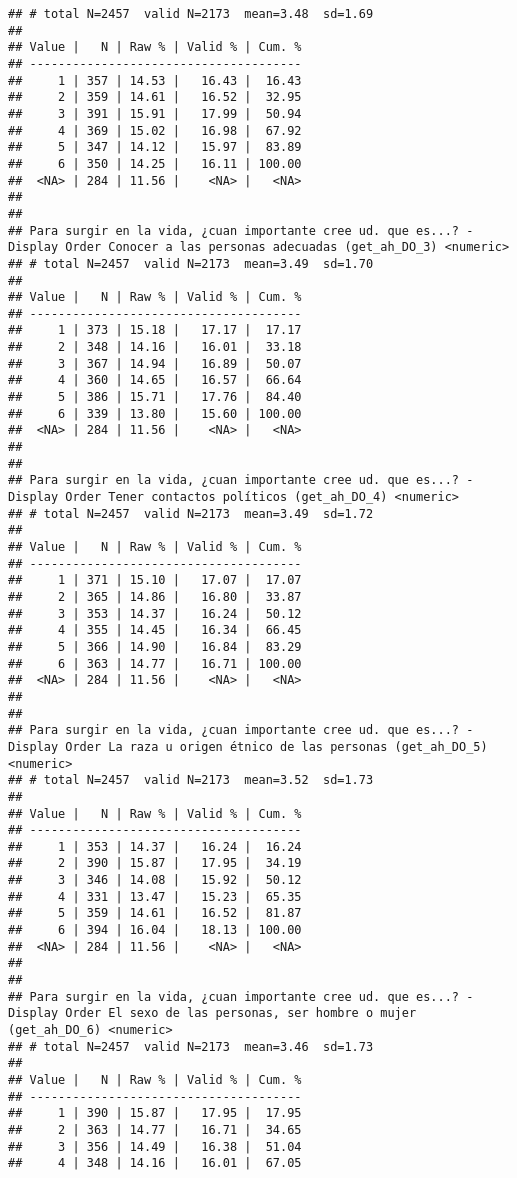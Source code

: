 \documentclass[
  10,
  landscape,
  legalpaper]{article}
\begin{document}
\begin{verbatim}
## # total N=2457  valid N=2173  mean=3.48  sd=1.69
## 
## Value |   N | Raw % | Valid % | Cum. %
## --------------------------------------
##     1 | 357 | 14.53 |   16.43 |  16.43
##     2 | 359 | 14.61 |   16.52 |  32.95
##     3 | 391 | 15.91 |   17.99 |  50.94
##     4 | 369 | 15.02 |   16.98 |  67.92
##     5 | 347 | 14.12 |   15.97 |  83.89
##     6 | 350 | 14.25 |   16.11 | 100.00
##  <NA> | 284 | 11.56 |    <NA> |   <NA>
## 
## 
## Para surgir en la vida, ¿cuan importante cree ud. que es...? - Display Order Conocer a las personas adecuadas (get_ah_DO_3) <numeric>
## # total N=2457  valid N=2173  mean=3.49  sd=1.70
## 
## Value |   N | Raw % | Valid % | Cum. %
## --------------------------------------
##     1 | 373 | 15.18 |   17.17 |  17.17
##     2 | 348 | 14.16 |   16.01 |  33.18
##     3 | 367 | 14.94 |   16.89 |  50.07
##     4 | 360 | 14.65 |   16.57 |  66.64
##     5 | 386 | 15.71 |   17.76 |  84.40
##     6 | 339 | 13.80 |   15.60 | 100.00
##  <NA> | 284 | 11.56 |    <NA> |   <NA>
## 
## 
## Para surgir en la vida, ¿cuan importante cree ud. que es...? - Display Order Tener contactos políticos (get_ah_DO_4) <numeric>
## # total N=2457  valid N=2173  mean=3.49  sd=1.72
## 
## Value |   N | Raw % | Valid % | Cum. %
## --------------------------------------
##     1 | 371 | 15.10 |   17.07 |  17.07
##     2 | 365 | 14.86 |   16.80 |  33.87
##     3 | 353 | 14.37 |   16.24 |  50.12
##     4 | 355 | 14.45 |   16.34 |  66.45
##     5 | 366 | 14.90 |   16.84 |  83.29
##     6 | 363 | 14.77 |   16.71 | 100.00
##  <NA> | 284 | 11.56 |    <NA> |   <NA>
## 
## 
## Para surgir en la vida, ¿cuan importante cree ud. que es...? - Display Order La raza u origen étnico de las personas (get_ah_DO_5) <numeric>
## # total N=2457  valid N=2173  mean=3.52  sd=1.73
## 
## Value |   N | Raw % | Valid % | Cum. %
## --------------------------------------
##     1 | 353 | 14.37 |   16.24 |  16.24
##     2 | 390 | 15.87 |   17.95 |  34.19
##     3 | 346 | 14.08 |   15.92 |  50.12
##     4 | 331 | 13.47 |   15.23 |  65.35
##     5 | 359 | 14.61 |   16.52 |  81.87
##     6 | 394 | 16.04 |   18.13 | 100.00
##  <NA> | 284 | 11.56 |    <NA> |   <NA>
## 
## 
## Para surgir en la vida, ¿cuan importante cree ud. que es...? - Display Order El sexo de las personas, ser hombre o mujer (get_ah_DO_6) <numeric>
## # total N=2457  valid N=2173  mean=3.46  sd=1.73
## 
## Value |   N | Raw % | Valid % | Cum. %
## --------------------------------------
##     1 | 390 | 15.87 |   17.95 |  17.95
##     2 | 363 | 14.77 |   16.71 |  34.65
##     3 | 356 | 14.49 |   16.38 |  51.04
##     4 | 348 | 14.16 |   16.01 |  67.05

\end{verbatim}
\end{document}
